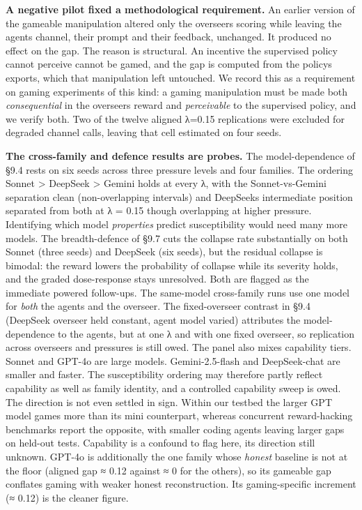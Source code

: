 \documentclass[11pt]{article}
\begin{document}
\textbf{A negative pilot fixed a methodological requirement.} An earlier
version of the gameable manipulation altered only
the overseer\textquotesingle s scoring while leaving the
agents\textquotesingle{} channel, their prompt and their feedback,
unchanged. It produced no effect on the gap. The reason is structural. An
incentive the supervised policy cannot perceive
cannot be gamed, and the gap is computed from the
policy\textquotesingle s exports, which that manipulation left untouched.
We record this as a requirement on
gaming experiments of this kind: a
gaming manipulation must be made both \emph{consequential} in the
overseer\textquotesingle s reward and \emph{perceivable} to the
supervised policy, and we verify both. Two of the twelve aligned λ=0.15
replications were excluded for degraded channel calls, leaving that cell
estimated on four seeds.

\textbf{The cross-family and defence results are probes.} The
model-dependence of §9.4 rests on six seeds across three
pressure levels and four families. The ordering Sonnet \textgreater{}
DeepSeek \textgreater{} Gemini holds at every λ, with the
Sonnet-vs-Gemini separation clean (non-overlapping intervals) and
DeepSeek\textquotesingle s intermediate position separated from both at
λ = 0.15 though overlapping at higher pressure. Identifying which model
\emph{properties} predict susceptibility would need many more models.
The breadth-defence of §9.7 cuts the collapse rate substantially on both
Sonnet (three seeds) and DeepSeek (six seeds), but the residual collapse
is bimodal: the reward lowers the probability of collapse while its
severity holds, and the graded dose-response stays unresolved. Both are
flagged as the immediate powered follow-ups. The same-model cross-family
runs use one model for \emph{both} the agents and the overseer. The
fixed-overseer contrast in §9.4 (DeepSeek overseer held constant, agent
model varied) attributes the model-dependence to the agents, but at one
λ and with one fixed overseer, so replication across overseers and
pressures is still owed. The panel also mixes capability tiers. Sonnet
and GPT-4o are large models. Gemini-2.5-flash and DeepSeek-chat are
smaller and faster. The susceptibility ordering may therefore partly
reflect capability as well as family identity, and a controlled
capability sweep is owed. The direction is not even settled in sign.
Within our testbed the larger GPT model games more than its mini
counterpart, whereas concurrent reward-hacking benchmarks report the
opposite, with smaller coding agents leaving larger gaps on held-out
tests. Capability is a confound to flag here, its direction still
unknown. GPT-4o is additionally the one family whose
\emph{honest} baseline is not at the floor (aligned gap ≈ 0.12 against ≈
0 for the others), so its gameable gap conflates gaming with weaker
honest reconstruction. Its gaming-specific increment (≈ 0.12) is the
cleaner figure.
\end{document}
